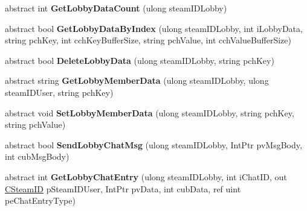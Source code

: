 \begin{DoxyCompactItemize}
\item 
\mbox{\label{class_valve_1_1_steamworks_1_1_i_steam_matchmaking_a7990565d56a4a0b88c219759fa9ba98c}} 
abstract int {\bfseries Get\+Lobby\+Data\+Count} (ulong steam\+I\+D\+Lobby)
\item 
\mbox{\label{class_valve_1_1_steamworks_1_1_i_steam_matchmaking_a14891917d2f464e84f874f1c39169955}} 
abstract bool {\bfseries Get\+Lobby\+Data\+By\+Index} (ulong steam\+I\+D\+Lobby, int i\+Lobby\+Data, string pch\+Key, int cch\+Key\+Buffer\+Size, string pch\+Value, int cch\+Value\+Buffer\+Size)
\item 
\mbox{\label{class_valve_1_1_steamworks_1_1_i_steam_matchmaking_aa1fa5686af31f7eac9d2855ab172acde}} 
abstract bool {\bfseries Delete\+Lobby\+Data} (ulong steam\+I\+D\+Lobby, string pch\+Key)
\item 
\mbox{\label{class_valve_1_1_steamworks_1_1_i_steam_matchmaking_a032e962fc5fc1df63614290e10a1eae7}} 
abstract string {\bfseries Get\+Lobby\+Member\+Data} (ulong steam\+I\+D\+Lobby, ulong steam\+I\+D\+User, string pch\+Key)
\item 
\mbox{\label{class_valve_1_1_steamworks_1_1_i_steam_matchmaking_aeff40f91b8c1960e5011e6452c4c53f5}} 
abstract void {\bfseries Set\+Lobby\+Member\+Data} (ulong steam\+I\+D\+Lobby, string pch\+Key, string pch\+Value)
\item 
\mbox{\label{class_valve_1_1_steamworks_1_1_i_steam_matchmaking_a8ebd7b15662e681dd52b19f108d72759}} 
abstract bool {\bfseries Send\+Lobby\+Chat\+Msg} (ulong steam\+I\+D\+Lobby, Int\+Ptr pv\+Msg\+Body, int cub\+Msg\+Body)
\item 
\mbox{\label{class_valve_1_1_steamworks_1_1_i_steam_matchmaking_aa218bd1f15e69745ece416dd3d4ea564}} 
abstract int {\bfseries Get\+Lobby\+Chat\+Entry} (ulong steam\+I\+D\+Lobby, int i\+Chat\+ID, out \hyperlink{struct_valve_1_1_steamworks_1_1_c_steam_i_d}{C\+Steam\+ID} p\+Steam\+I\+D\+User, Int\+Ptr pv\+Data, int cub\+Data, ref uint pe\+Chat\+Entry\+Type)

\end{DoxyCompactItemize}
